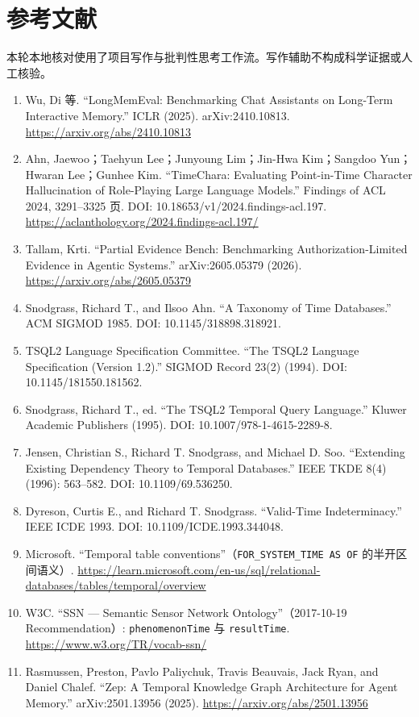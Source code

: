 \documentclass[UTF8,11pt]{ctexart}
\begin{document}
\section*{参考文献}
本轮本地核对使用了项目写作与批判性思考工作流。写作辅助不构成科学证据或人工核验。
\sloppy
\begin{enumerate}[leftmargin=*,nosep]\small
\item Wu, Di 等. ``LongMemEval: Benchmarking Chat Assistants on Long-Term Interactive Memory.'' ICLR (2025). arXiv:2410.10813. \url{https://arxiv.org/abs/2410.10813}
\item Ahn, Jaewoo；Taehyun Lee；Junyoung Lim；Jin-Hwa Kim；Sangdoo Yun；Hwaran Lee；Gunhee Kim. ``TimeChara: Evaluating Point-in-Time Character Hallucination of Role-Playing Large Language Models.'' Findings of ACL 2024, 3291--3325 页. DOI: 10.18653/v1/2024.findings-acl.197. \url{https://aclanthology.org/2024.findings-acl.197/}
\item Tallam, Krti. ``Partial Evidence Bench: Benchmarking Authorization-Limited Evidence in Agentic Systems.'' arXiv:2605.05379 (2026). \url{https://arxiv.org/abs/2605.05379}
\item Snodgrass, Richard T., and Ilsoo Ahn. ``A Taxonomy of Time Databases.'' ACM SIGMOD 1985. DOI: 10.1145/318898.318921.
\item TSQL2 Language Specification Committee. ``The TSQL2 Language Specification (Version 1.2).'' SIGMOD Record 23(2) (1994). DOI: 10.1145/181550.181562.
\item Snodgrass, Richard T., ed. ``The TSQL2 Temporal Query Language.'' Kluwer Academic Publishers (1995). DOI: 10.1007/978-1-4615-2289-8.
\item Jensen, Christian S., Richard T. Snodgrass, and Michael D. Soo. ``Extending Existing Dependency Theory to Temporal Databases.'' IEEE TKDE 8(4) (1996): 563--582. DOI: 10.1109/69.536250.
\item Dyreson, Curtis E., and Richard T. Snodgrass. ``Valid-Time Indeterminacy.'' IEEE ICDE 1993. DOI: 10.1109/ICDE.1993.344048.
\item Microsoft. ``Temporal table conventions''（\texttt{FOR\_SYSTEM\_TIME AS OF} 的半开区间语义）. \url{https://learn.microsoft.com/en-us/sql/relational-databases/tables/temporal/overview}
\item W3C. ``SSN --- Semantic Sensor Network Ontology''（2017-10-19 Recommendation）: \texttt{phenomenonTime} 与 \texttt{resultTime}. \url{https://www.w3.org/TR/vocab-ssn/}
\item Rasmussen, Preston, Pavlo Paliychuk, Travis Beauvais, Jack Ryan, and Daniel Chalef. ``Zep: A Temporal Knowledge Graph Architecture for Agent Memory.'' arXiv:2501.13956 (2025). \url{https://arxiv.org/abs/2501.13956}

\end{enumerate}
\end{document}
